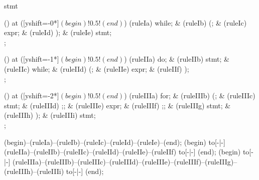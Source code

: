 \begin{syntax}{stmt}
  
  \node[sequence] () at ([yshift=-0*\syntaxruledist]$(begin)!0.5!(end)$) {
    \node[terminal]    (ruleIa) {while};
    &
    \node[terminal]    (ruleIb) {(};
    &
    \node[nonterminal] (ruleIc) {expr};
    &
    \node[terminal]    (ruleId) {)};
    &
    \node[nonterminal] (ruleIe) {stmt};
    \\
  };
  
  \node[sequence] () at ([yshift=-1*\syntaxruledist]$(begin)!0.5!(end)$) {
    \node[terminal]    (ruleIIa) {do};
    &
    \node[nonterminal] (ruleIIb) {stmt};
    &
    \node[terminal]    (ruleIIc) {while};
    &
    \node[terminal]    (ruleIId) {(};
    &
    \node[nonterminal] (ruleIIe) {expr};
    &
    \node[terminal]    (ruleIIf) {)};
    \\
  };
  
  \node[sequence,column sep=0.6cm] () at ([yshift=-2*\syntaxruledist]$(begin)!0.5!(end)$) {
    \node[terminal]    (ruleIIIa) {for};
    &
    \node[terminal]    (ruleIIIb) {(};
    &
    \node[nonterminal] (ruleIIIc) {stmt};
    &
    \node[terminal]    (ruleIIId) {;};
    &
    \node[nonterminal] (ruleIIIe) {expr};
    &
    \node[terminal]    (ruleIIIf) {;};
    &
    \node[nonterminal] (ruleIIIg) {stmt};
    &
    \node[terminal]    (ruleIIIh) {)};
    &
    \node[nonterminal] (ruleIIIi) {stmt};
    \\
  };
  
  \draw[path] (begin)--(ruleIa)--(ruleIb)--(ruleIc)--(ruleId)--(ruleIe)--(end);
  \draw[path] (begin) to[-|-] (ruleIIa)--(ruleIIb)--(ruleIIc)--(ruleIId)--(ruleIIe)--(ruleIIf) to[-|-] (end);
  \draw[path] (begin) to[-|-] (ruleIIIa)--(ruleIIIb)--(ruleIIIc)--(ruleIIId)--(ruleIIIe)--(ruleIIIf)--(ruleIIIg)--(ruleIIIh)--(ruleIIIi) to[-|-] (end);
\end{syntax}
